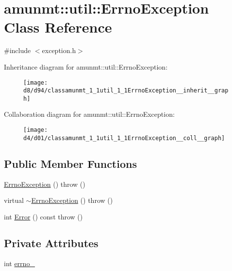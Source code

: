 \hypertarget{classamunmt_1_1util_1_1ErrnoException}{}\section{amunmt\+:\+:util\+:\+:Errno\+Exception Class Reference}
\label{classamunmt_1_1util_1_1ErrnoException}


{\ttfamily \#include $<$exception.\+h$>$}



Inheritance diagram for amunmt\+:\+:util\+:\+:Errno\+Exception\+:
\nopagebreak
\begin{figure}[H]
\begin{center}
\leavevmode
\texttt{[image: d8/d94/classamunmt\_1\_1util\_1\_1ErrnoException\_\_inherit\_\_graph]}
\end{center}
\end{figure}


Collaboration diagram for amunmt\+:\+:util\+:\+:Errno\+Exception\+:
\nopagebreak
\begin{figure}[H]
\begin{center}
\leavevmode
\texttt{[image: d4/d01/classamunmt\_1\_1util\_1\_1ErrnoException\_\_coll\_\_graph]}
\end{center}
\end{figure}
\subsection*{Public Member Functions}
\begin{DoxyCompactItemize}
\item 
\hyperlink{classamunmt_1_1util_1_1ErrnoException_a13d12b1e827d068b47b08000e07a4b3b}{Errno\+Exception} ()  throw ()
\item 
virtual \hyperlink{classamunmt_1_1util_1_1ErrnoException_a8e8d1e0f707481b26abf77af91342e18}{$\sim$\+Errno\+Exception} ()  throw ()
\item 
int \hyperlink{classamunmt_1_1util_1_1ErrnoException_adf255b9695a52bf9c24bed5f5413d9e5}{Error} () const   throw ()
\end{DoxyCompactItemize}
\subsection*{Private Attributes}
\begin{DoxyCompactItemize}
\item 
int \hyperlink{classamunmt_1_1util_1_1ErrnoException_a865d5044fe0783940c1121c46ea4762b}{errno\+\_\+}
\end{DoxyCompactItemize}


